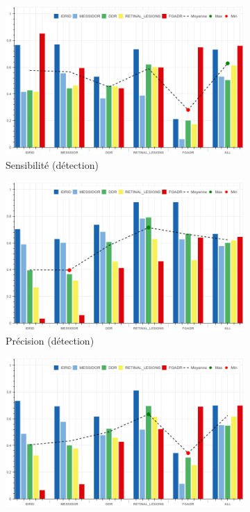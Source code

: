 \begin{figure}[H]
	\begin{subfigure}{0.495\linewidth}
		\includegraphics[width=\linewidth]{gnuplot/segmentation_lesions/detection/sensitivity}
		\caption{Sensibilité (détection)}
	\end{subfigure}
	\begin{subfigure}{0.495\linewidth}
		\includegraphics[width=\linewidth]{gnuplot/segmentation_lesions/detection/precision}
		\caption{Précision (détection)}
	\end{subfigure}
	\begin{subfigure}{0.495\textwidth}
		\includegraphics[width=\linewidth]{gnuplot/segmentation_lesions/detection/F1}

\end{subfigure}
\end{figure}

